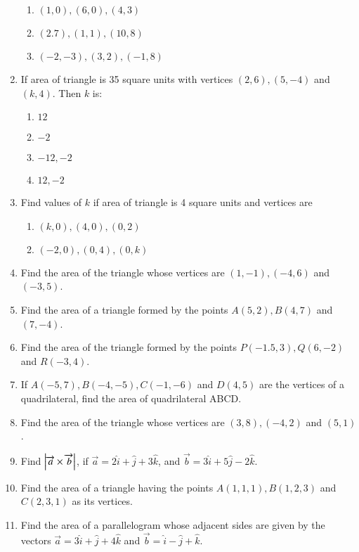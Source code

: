 \begin{enumerate}[label=\thesubsection.\arabic*,ref=\thesubsection.\theenumi]
\begin{enumerate}
\item $(1,0), (6,0), (4,3)$
\item $(2.7), (1,1), (10,8)$
\item $(-2,-3), (3,2), (-1,8)$
\end{enumerate}
\item If area of triangle is 35 square units with vertices $(2,6), (5,-4)$ and $(k,4)$. Then $k$ is:
\begin{enumerate}
\item $12$
\item $-2$
\item $-12,-2$
\item $12, -2$
\end{enumerate}
\item Find values of $k$ if area of triangle is 4 square units and vertices are
\begin{enumerate}
\item $(k,0), (4,0), (0,2)$
\item $(-2,0), (0,4), (0,k)$
\end{enumerate}
\item Find the area of the triangle whose vertices are $(1,-1), (-4,6)$ and $(-3,5)$.
\item Find the area of a triangle formed by the points $A(5,2), B(4,7)$ and $(7,-4)$.
\item Find the area of the triangle formed by the points $P(-1.5,3), Q(6,-2)$ and $R(-3,4)$.
\item If $A(-5,7), B(-4,-5), C(-1,-6)$ and $D(4,5)$ are the vertices of a quadrilateral, find the area of quadrilateral ABCD.
\item Find the area of the triangle whose vertices are $(3,8), (-4,2)$ and $(5,1)$.
\item Find $\left\vert\overrightarrow{a} \times \overrightarrow{b}\right\vert$, if $\overrightarrow{a} = 2\hat{i} +\hat{j} +3\hat{k}$, and $\overrightarrow{b} = 3\hat{i} +5\hat{j} -2\hat{k}$.
\item Find the area of a triangle having the points $A(1,1,1), B(1,2,3)$ and $C(2,3,1)$ as its vertices.
\item Find the area of a parallelogram whose adjacent sides are given by the vectors $\overrightarrow{a}=3\hat{i} +\hat{j} +4\hat{k}$ and $\overrightarrow{b}=\hat{i} -\hat{j} +\hat{k}$.
\end{enumerate}

